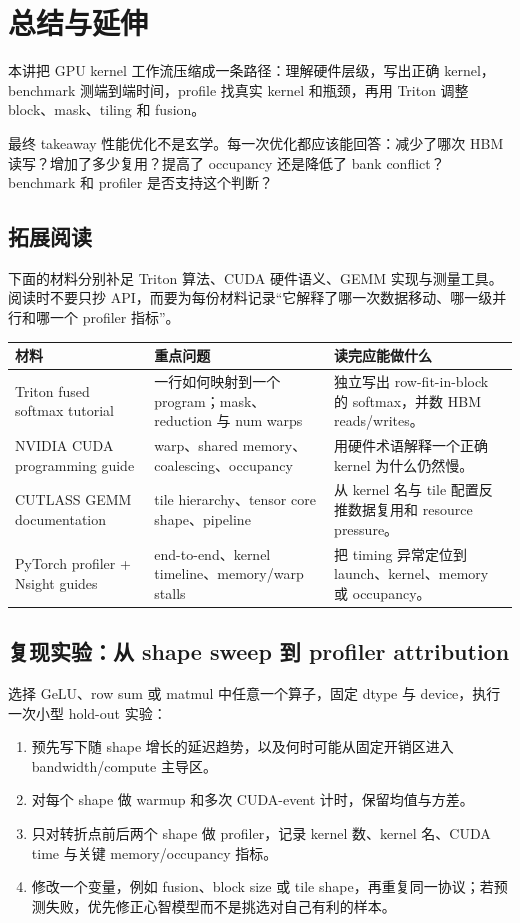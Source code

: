 \section{总结与延伸}
本讲把 GPU kernel 工作流压缩成一条路径：理解硬件层级，写出正确 kernel，benchmark 测端到端时间，profile 找真实 kernel 和瓶颈，再用 Triton 调整 block、mask、tiling 和 fusion。
\begin{importantbox}{最终 takeaway}
性能优化不是玄学。每一次优化都应该能回答：减少了哪次 HBM 读写？增加了多少复用？提高了 occupancy 还是降低了 bank conflict？benchmark 和 profiler 是否支持这个判断？
\end{importantbox}
\subsection{拓展阅读}

下面的材料分别补足 Triton 算法、CUDA 硬件语义、GEMM 实现与测量工具。阅读时不要只抄 API，而要为每份材料记录“它解释了哪一次数据移动、哪一级并行和哪一个 profiler 指标”。

\begin{longtable}{p{}p{}p{}}
\toprule
\textbf{材料} & \textbf{重点问题} & \textbf{读完应能做什么} \\
\midrule
Triton fused softmax tutorial & 一行如何映射到一个 program；mask、reduction 与 num warps & 独立写出 row-fit-in-block 的 softmax，并数 HBM reads/writes。 \\
NVIDIA CUDA programming guide & warp、shared memory、coalescing、occupancy & 用硬件术语解释一个正确 kernel 为什么仍然慢。 \\
CUTLASS GEMM documentation & tile hierarchy、tensor core shape、pipeline & 从 kernel 名与 tile 配置反推数据复用和 resource pressure。 \\
PyTorch profiler + Nsight guides & end-to-end、kernel timeline、memory/warp stalls & 把 timing 异常定位到 launch、kernel、memory 或 occupancy。 \\
\bottomrule
\end{longtable}

\subsection{复现实验：从 shape sweep 到 profiler attribution}

选择 GeLU、row sum 或 matmul 中任意一个算子，固定 dtype 与 device，执行一次小型 hold-out 实验：

\begin{enumerate}
    \item 预先写下随 shape 增长的延迟趋势，以及何时可能从固定开销区进入 bandwidth/compute 主导区。
    \item 对每个 shape 做 warmup 和多次 CUDA-event 计时，保留均值与方差。
    \item 只对转折点前后两个 shape 做 profiler，记录 kernel 数、kernel 名、CUDA time 与关键 memory/occupancy 指标。
    \item 修改一个变量，例如 fusion、block size 或 tile shape，再重复同一协议；若预测失败，优先修正心智模型而不是挑选对自己有利的样本。
\end{enumerate}

